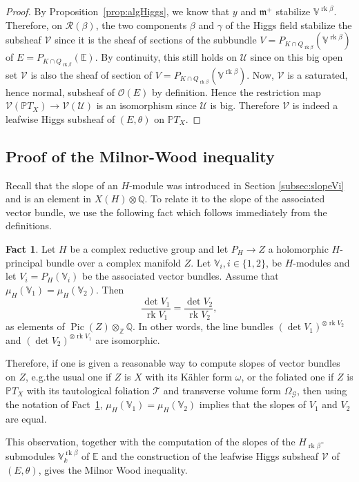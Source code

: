 \documentclass[10pt]{amsart}
\let\mathcal\mathscr
\theoremstyle{plain}
\theoremstyle{definition}
\newtheorem{fact}[theo]{Fact}
\DeclareMathOperator{\Pic}{Pic}
\DeclareMathOperator{\rk}{rk}
\newcommand{\cG}{\mathcal{G}}
\newcommand{\cO}{\mathcal{O}}
\newcommand{\cR}{\mathcal{R}}
\newcommand{\cT}{\mathcal{T}}
\newcommand{\cU}{\mathcal{U}}
\newcommand{\cV}{\mathcal{V}}
\newcommand{\bE}{\mathbb{E}}
\newcommand{\bV}{\mathbb{V}}
\newcommand{\bZ}{\mathbb{Z}}
\newcommand{\bQ}{\mathbb{Q}}
\newcommand{\PTX}{{\mathbb{P}T_X}}
\newcommand{\Vb}{\mathbb{V}^{\rgb}}
\newcommand{\fm}{\mathfrak{m}}
\newcommand{\rgb}{{\rk\beta}}
\providecommand{\eg}{e.g.}\providecommand{\ie}{i.e.}\providecommand{\etc}{etc.}\providecommand{\resp}{resp.}\providecommand{\cf}{cf.}
\begin{document}
\begin{proof}
By Proposition~\ref{prop:algHiggs}, we know that $y$ and $\fm^+$ stabilize
$\Vb$. Therefore, on $\cR(\beta)$, the two components $\beta$ and $\gamma$ of the Higgs field
stabilize the subsheaf $\cV$ since it is the
sheaf of sections of the subbundle $V=P_{K\cap Q_\rgb}(\Vb)$
of $ E=P_{K\cap Q_\rgb}(\bE)$. By continuity, this still holds on $\cU$ since on this big open set
$\cV$ is also the sheaf of section of $V=P_{K\cap Q_\rgb}(\Vb)$.
Now, $\cV$ is a saturated, hence normal, subsheaf of
$\cO(E)$ by definition. Hence the restriction map $\cV(\PTX)\to \cV(\cU)$ is an isomorphism
since $\cU$ is big. Therefore $\cV$ is indeed a leafwise Higgs subsheaf of
$(E,\theta)$ on $\PTX$.
\end{proof}

\subsection{Proof of the Milnor-Wood inequality}\label{subsec:proofMW}

Recall that the slope of an $H$-module was introduced in Section \ref{subsec:slopeVi} and is
an element in $X(H) \otimes \bQ$. To relate it to the slope of the
associated vector bundle, we use the following fact which follows immediately from the definitions.

\begin{fact}
\label{fact:slopes}
Let $H$ be a complex reductive group and let $P_H \to Z$ a holomorphic $H$-principal bundle over a
complex manifold $Z$.
Let $\bV_i,i \in \{1,2\}$, be $H$-modules and let $V_i=P_H(\bV_i)$ be the associated vector bundles.
Assume that $\mu_H(\bV_1)=\mu_H(\bV_2)$. Then
$$ \frac{\det V_1}{\rk V_1} = \frac{\det V_2}{\rk V_2 }, $$
as elements of $\Pic(Z) \otimes_\bZ \bQ$. In other words, the line bundles
$(\det V_1)^{\otimes\rk V_2}$ and $(\det V_2)^{\otimes\rk V_1}$ are isomorphic.
\end{fact}

Therefore, if one is given a reasonable way to compute slopes of vector
bundles on
$Z$, \eg the usual one if $Z$ is $X$ with its Kähler form $\omega$,
or the foliated one if $Z$ is $\PTX$ with its tautological foliation $\cT$ and transverse
volume form
$\Omega_{\cG}$, then using the notation of Fact~\ref{fact:slopes}, $\mu_H(\bV_1)=\mu_H(\bV_2)$ implies
that the slopes of $V_1$ and $V_2$
are equal.

This observation, together with the computation of the slopes of the $H_\rgb$-submodules $\Vb_k$ of
$\bE$ and the construction of the leafwise Higgs subsheaf $\cV$ of $(E,\theta)$,
gives the Milnor Wood inequality.
\end{document}

